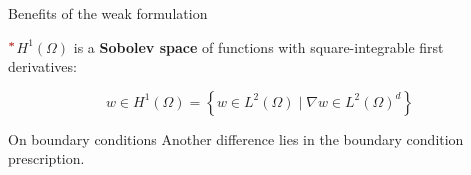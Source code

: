 \documentclass[10pt,externalviewer]{beamer}
\begin{document}
\begin{frame}{Benefits of the weak formulation}
   

   \vspace{-0.5cm}


   \vspace{0.6cm}

   $^{\boldsymbol{\textcolor{BrickRed}{\ast}}}$\scriptsize{$H^1(\Omega)$ is a \textbf{Sobolev space} of functions with square-integrable first derivatives:}

   \begin{equation*}
      w\in H^1(\Omega)=\left\{w\in L^2(\Omega)\mid\nabla w\in L^2(\Omega)^d\right\}
   \end{equation*}

   \normalsize
\end{frame}

\begin{frame}{On boundary conditions}
   Another difference lies in the boundary condition prescription.

   \vspace{0.35cm}

   \pause

   

   \vspace{-0.5cm}

   \pause

   
\end{frame}
\end{document}
